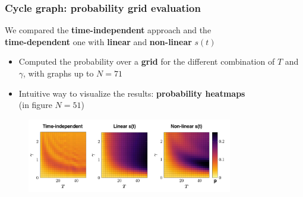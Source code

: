 \documentclass{beamer}
\newcommand{\bb}[1]{\textbf{\textcolor{darkish_blue}{#1}}}
\begin{document}
\begin{frame}
\frametitle{Cycle graph: probability grid evaluation}

\centering
\begin{tcolorbox}[width=10cm, colframe=darkblue, colback=white, halign=center, left=0pt, right =0pt]
\large We compared the \bb{time-independent} approach and the\\ \bb{time-dependent} one with \bb{linear} and \bb{non-linear} $s(t)$
\end{tcolorbox}

\begin{itemize}
	\item Computed the probability over a \bb{grid} for the different combination of $T$ and $\gamma$, with graphs up to $N=71$
\end{itemize}
\begin{itemize}
	\item Intuitive way to visualize the results: \bb{probability heatmaps}\\ \footnotesize(in figure  $N=51$)
\end{itemize}
\begin{figure}
	\centering
	\includegraphics[width=0.8\textwidth]{heatmap_plots.pdf}
\end{figure}

\end{frame}

\end{document}
